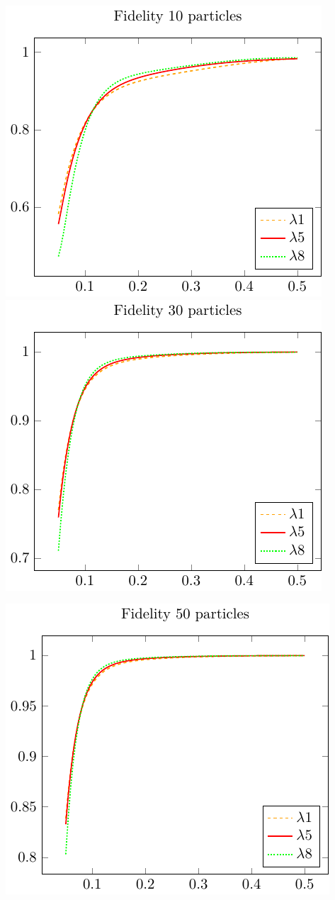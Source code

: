 \includegraphics{./gfx/fidelity_compare10.pdf}
\includegraphics{./gfx/fidelity_compare30.pdf}

\begin{center}
    \includegraphics{./gfx/fidelity_compare50.pdf}
\end{center}
